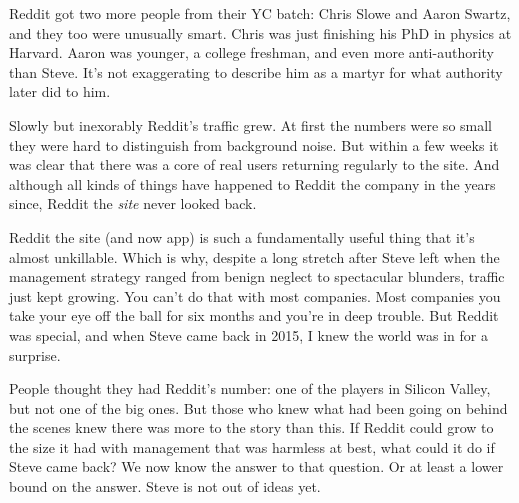 Reddit got two more people from their YC batch: Chris Slowe and Aaron
Swartz, and they too were unusually smart. Chris was just finishing his
PhD in physics at Harvard. Aaron was younger, a college freshman, and
even more anti-authority than Steve. It's not exaggerating to describe
him as a martyr for what authority later did to him.

Slowly but inexorably Reddit's traffic grew. At first the numbers were
so small they were hard to distinguish from background noise. But within
a few weeks it was clear that there was a core of real users returning
regularly to the site. And although all kinds of things have happened to
Reddit the company in the years since, Reddit the \emph{site} never
looked back.

Reddit the site (and now app) is such a fundamentally useful thing that
it's almost unkillable. Which is why, despite a long stretch after Steve
left when the management strategy ranged from benign neglect to
spectacular blunders, traffic just kept growing. You can't do that with
most companies. Most companies you take your eye off the ball for six
months and you're in deep trouble. But Reddit was special, and when
Steve came back in 2015, I knew the world was in for a surprise.

People thought they had Reddit's number: one of the players in Silicon
Valley, but not one of the big ones. But those who knew what had been
going on behind the scenes knew there was more to the story than this.
If Reddit could grow to the size it had with management that was
harmless at best, what could it do if Steve came back? We now know the
answer to that question. Or at least a lower bound on the answer. Steve
is not out of ideas yet.
